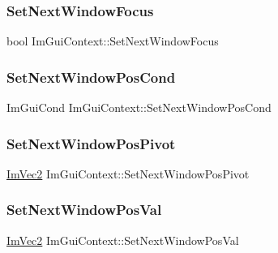 \subsubsection{\texorpdfstring{Set\+Next\+Window\+Focus}{SetNextWindowFocus}}
{\footnotesize\ttfamily bool Im\+Gui\+Context\+::\+Set\+Next\+Window\+Focus}

\hypertarget{struct_im_gui_context_afdf440b5e79ba7868e87e2c5136e1296}{}\label{struct_im_gui_context_afdf440b5e79ba7868e87e2c5136e1296} 
\subsubsection{\texorpdfstring{Set\+Next\+Window\+Pos\+Cond}{SetNextWindowPosCond}}
{\footnotesize\ttfamily Im\+Gui\+Cond Im\+Gui\+Context\+::\+Set\+Next\+Window\+Pos\+Cond}

\hypertarget{struct_im_gui_context_a0da8611453fefe211a63abce142f9d74}{}\label{struct_im_gui_context_a0da8611453fefe211a63abce142f9d74} 
\subsubsection{\texorpdfstring{Set\+Next\+Window\+Pos\+Pivot}{SetNextWindowPosPivot}}
{\footnotesize\ttfamily \hyperlink{struct_im_vec2}{Im\+Vec2} Im\+Gui\+Context\+::\+Set\+Next\+Window\+Pos\+Pivot}

\hypertarget{struct_im_gui_context_a8cb5445e4f740af210aa1794707dffbc}{}\label{struct_im_gui_context_a8cb5445e4f740af210aa1794707dffbc} 
\subsubsection{\texorpdfstring{Set\+Next\+Window\+Pos\+Val}{SetNextWindowPosVal}}
{\footnotesize\ttfamily \hyperlink{struct_im_vec2}{Im\+Vec2} Im\+Gui\+Context\+::\+Set\+Next\+Window\+Pos\+Val}

\hypertarget{struct_im_gui_context_ad0a5c6930741d040141ab7b097064c20}{}\label{struct_im_gui_context_ad0a5c6930741d040141ab7b097064c20} 
